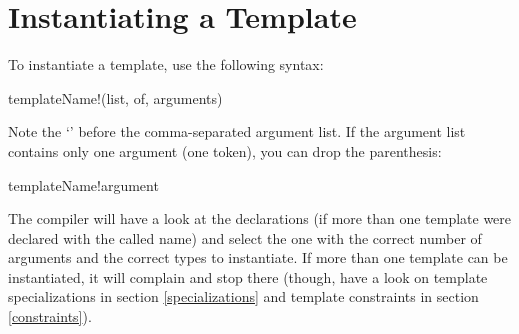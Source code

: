 \section{Instantiating a Template}\label{instantiating}

To instantiate a template, use the following syntax:

\begin{dcode}
templateName!(list, of, arguments)
\end{dcode}


Note the `\DD{!}' before the comma-separated argument list. If the argument list contains only one argument (one token), you can drop the parenthesis:

\begin{dcode}
templateName!argument
\end{dcode}



The compiler will have a look at the declarations (if more than one template were declared with the called name) and select the one with the correct number of arguments and the correct types to instantiate. If more than one template can be instantiated, it will complain  and stop there (though, have a look on template specializations in section \ref{specializations} and template constraints in section \ref{constraints}).

